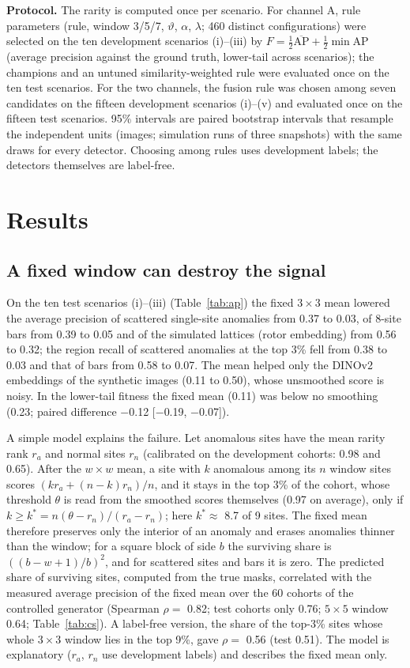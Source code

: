 \documentclass[final,5p,times,twocolumn,authoryear]{elsarticle}
\begin{document}
\textbf{Protocol.} The rarity is computed once per scenario. For channel A, rule parameters (rule, window 3/5/7, $\vartheta$, $\alpha$, $\lambda$; 460 distinct configurations) were selected on the ten development scenarios (i)--(iii) by $F=\tfrac12\overline{\mathrm{AP}}+\tfrac12\min\mathrm{AP}$ (average precision against the ground truth, lower-tail across scenarios); the champions and an untuned similarity-weighted rule were evaluated once on the ten test scenarios. For the two channels, the fusion rule was chosen among seven candidates on the fifteen development scenarios (i)--(v) and evaluated once on the fifteen test scenarios. 95\% intervals are paired bootstrap intervals that resample the independent units (images; simulation runs of three snapshots) with the same draws for every detector. Choosing among rules uses development labels; the detectors themselves are label-free.

\section{Results}
\subsection{A fixed window can destroy the signal}
On the ten test scenarios (i)--(iii) (Table~\ref{tab:ap}) the fixed $3\times3$ mean lowered the average precision of scattered single-site anomalies from 0.37 to 0.03, of 8-site bars from 0.39 to 0.05 and of the simulated lattices (rotor embedding) from 0.56 to 0.32; the region recall of scattered anomalies at the top 3\% fell from 0.38 to 0.03 and that of bars from 0.58 to 0.07. The mean helped only the DINOv2 embeddings of the synthetic images (0.11 to 0.50), whose unsmoothed score is noisy. In the lower-tail fitness the fixed mean (0.11) was below no smoothing (0.23; paired difference $-$0.12 [$-$0.19, $-$0.07]).

A simple model explains the failure. Let anomalous sites have the mean rarity rank $r_a$ and normal sites $r_n$ (calibrated on the development cohorts: 0.98 and 0.65). After the $w\times w$ mean, a site with $k$ anomalous among its $n$ window sites scores $(kr_a+(n-k)r_n)/n$, and it stays in the top 3\% of the cohort, whose threshold $\theta$ is read from the smoothed scores themselves (0.97 on average), only if $k\ge k^{*}=n(\theta-r_n)/(r_a-r_n)$; here $k^{*}\approx$ 8.7 of 9 sites. The fixed mean therefore preserves only the interior of an anomaly and erases anomalies thinner than the window; for a square block of side $b$ the surviving share is $((b-w+1)/b)^2$, and for scattered sites and bars it is zero. The predicted share of surviving sites, computed from the true masks, correlated with the measured average precision of the fixed mean over the 60 cohorts of the controlled generator (Spearman $\rho=$ 0.82; test cohorts only 0.76; $5\times5$ window 0.64; Table~\ref{tab:cs}). A label-free version, the share of the top-3\% sites whose whole $3\times3$ window lies in the top 9\%, gave $\rho=$ 0.56 (test 0.51). The model is explanatory ($r_a$, $r_n$ use development labels) and describes the fixed mean only.
\end{document}
